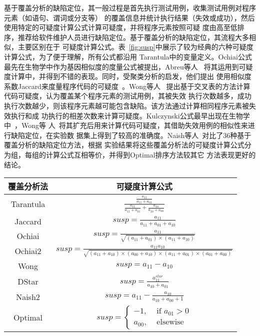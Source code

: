 基于覆盖分析的缺陷定位，其一般过程是首先执行测试用例，收集测试用例对程序元素（如语句、谓词或分支等）
的覆盖信息并统计执行结果（失效或成功），然后使用特定的可疑度计算公式计算可疑度，并将程序元素按照可疑
度由高至低排序，推荐给软件维护人员进行缺陷定位。基于覆盖分析的缺陷定位，其流程大多相似，主要区别在于
可疑度计算公式。表~\ref{fig:susp}中展示了较为经典的六种可疑度计算公式，为了便于理解，所有公式都沿用
Tarantula中的变量定义。Ochiai公式最先在生物学中作为基因相似度的度量公式被提出，Abreu等人
~\cite{abreu2007accuracy}将其运用到可疑度计算中，并得到不错的表现。同时，受聚类分析的启发，他们提出
使用相似度系数Jaccard来度量程序代码的可疑度~\cite{abreu2007accuracy}。Wong等人
~\cite{wong2008crosstab}提出基于交叉表的方法计算代码可疑度，认为覆盖某个程序元素的测试用例，其被失效
执行次数越多，成功执行次数越少，则该程序元素越可能包含缺陷。该方法通过计算相同程序元素被失效执行和成
功执行的相差次数来计算可疑度。Kulczynski公式最早出现在生物学中~\cite{willett2003similarity}，Wong等
人~\cite{wong2014dstar}将其扩充后用来计算代码可疑度，其借助失效用例的相似性来进行缺陷定位，在实验数
据集上得到了较高的准确度。Naish等人~\cite{naish2011model}对比了36种基于覆盖分析的缺陷定位方法，根据
实验结果将这些覆盖分析法的可疑度计算公式分为组，每组的计算公式互相等价，并得到Optimal排序方法较其它
方法表现更好的结论。

\begin{center}
\label{fig:susp}
\begin{tabular}{|c|c|}
\hline
覆盖分析法 & 可疑度计算公式 \\ \hline
Tarantula & $\frac{\frac{a_{11}}{a_{11}+a_{01}}}{\frac{a_{11}}{a_{11}+a_{01}}+\frac{a_{10}}{a_{10}+a_{00}}}$\\ 
Jaccard & $susp = \frac{a_{11}}{a_{11}+a_{01}+a_{10}}$\\ 
Ochiai & $susp = \frac{a_{11}}{\sqrt{(a_{11}+a_{01})\times(a_{11}+a_{10})}}$\\
Ochiai2 & $susp = \frac{a_{11}a_{10}}{\sqrt{(a_{11}+a_{10})\times (a_{00}+a_{10})\times (a_{11}+a_{01})\times (a_{01}+a_{00})}}$\\ 
Wong & $susp = a_{11}-a_{10}$\\
DStar & $susp = \frac{a_{11}^{star}}{a_{10}+a_{01}}$\\ 
Naish2 & $susp = a_{11}-\frac{a_{10}}{a_{10}+a_{00}+1}$ \\
Optimal & $susp = \begin{cases}
  -1, & \text{ if } a_{01}>0 \\ 
  a_{00}, & \text{ elsewise }  
  \end{cases}$\\ \hline
\end{tabular}
\end{center}





